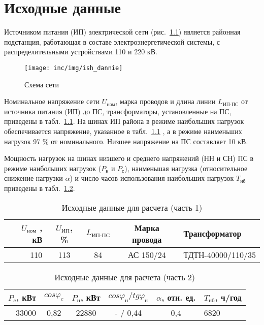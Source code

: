 \chapter{Исходные данные}
\label{cha:data}

Источником питания (ИП) электрической сети (рис.~\ref{fig:scheme}) является районная подстанция, работающая в составе электроэнергетической системы, с распределительными устройствами 110 и 220 кВ.

\renewcommand{\thefigure}{1}
\begin{figure}
	\centering
	\texttt{[image: inc/img/ish\_dannie]}
	\caption{Схема сети}
	\label{fig:scheme}
\end{figure}

Номинальное напряжение сети $U_{\text{ном}}$, марка проводов и длина линии $L_{\text{ИП-ПС}}$ от источника питания (ИП) до ПС, трансформаторы, установленные на ПС, приведены в табл.~\ref{tab:tabl1}. На шинах ИП района в режиме наибольших нагрузок обеспечивается напряжение, указанное в табл.~\ref{tab:tabl1} , а в режиме наименьших нагрузок 97 \% от номинального. Низшее напряжение на ПС составляет 10 кВ.

Мощность нагрузок на шинах низшего и среднего напряжений (НН и СН) ПС в режиме наибольших нагрузок ($P_{\text{н}}$ и $P_{\text{с}}$), наименьшая нагрузка (относительное снижение нагрузки $\alpha$) и число часов использования наибольших нагрузок $T_{\text{нб}}$ приведены в табл.~\ref{tab:tabl2}.

\renewcommand{\thetable}{\arabic{table}}
\begin{table}[H]
	\caption{Исходные данные для расчета (часть 1)}
	\begin{tabular}{|r|c|c|c|l|}
		\hline
		$U_{\text{ном}}$ , кВ & $U_{\text{ИП}}$, \% & $L_{\text{ИП-ПС}}$ & Марка провода & Трансформатор \\
		\hline
		110 & 113 & 84 & АС 150/24 & ТДТН-40000/110/35 \\
		\hline
	\end{tabular}
	\label{tab:tabl1}
\end{table}

\begin{table}[H]
	\caption{Исходные данные для расчета (часть 2)}
	\begin{tabular}{|r|c|c|c|c|l|}
		\hline
		$P_{c}$, кВт & $cos\varphi_c$ & $P_{\text{н}}$, кВт & $cos\varphi_{\text{н}} / tg\varphi_{\text{н}} $ & $\alpha$, отн. ед. & $T_{\text{нб}}$, ч/год \\
		\hline
		33000 & 0,82 & 22880 & - / 0,44 & 0,4 & 6820 \\
		\hline
	\end{tabular}
	\label{tab:tabl2}
\end{table}

